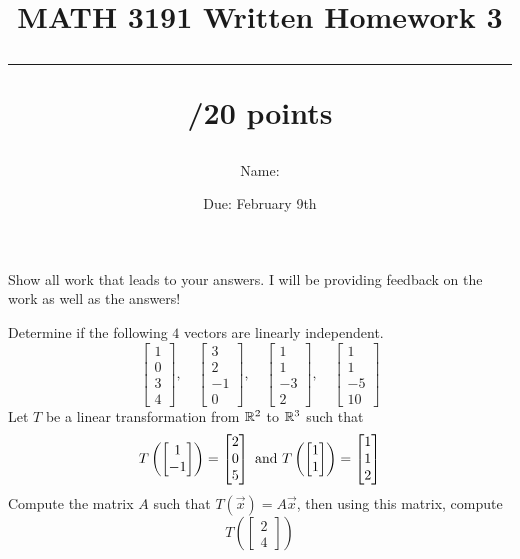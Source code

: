 \documentclass{exam}
\title{MATH 3191 Written Homework 3\\\rule{30pt}{1pt}/20 points}
\author{Name: \rule{150pt}{1pt}}
\date{Due: February 9th}
\begin{document}
\maketitle
Show all work that leads to your answers. I will be providing feedback on the work as well as the answers!
\begin{questions}
    \question[10] Determine if the following $4$ vectors are linearly independent.
    \[
        \begin{bmatrix}
            1\\0\\3\\4
        \end{bmatrix},\quad
        \begin{bmatrix}
            3\\2\\-1\\0
        \end{bmatrix},\quad
        \begin{bmatrix}
            1\\1\\-3\\2
        \end{bmatrix},\quad
        \begin{bmatrix}
            1\\1\\-5\\10
        \end{bmatrix}
    \]
    \newpage
    \question[10]Let $T$ be a linear transformation from $\mathbb{R}^2$ to $\mathbb{R}^3$ such that
    \[
        T\left(\begin{bmatrix}1\\-1\end{bmatrix}\right) = \begin{bmatrix}2\\0\\5\end{bmatrix}
            \textnormal{ and } 
            T\left(\begin{bmatrix}1\\1\end{bmatrix}\right) = \begin{bmatrix}1\\1\\2\end{bmatrix}
    \]
    Compute the matrix $A$ such that $T(\vec{x}) = A\vec{x}$, then using this matrix, compute
    \[
        T\left(\begin{bmatrix}2\\4\end{bmatrix}\right)
    \]
\end{questions}
\end{document}
